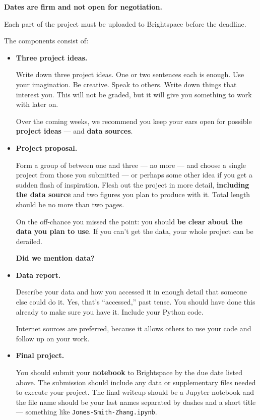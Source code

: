 \documentclass[11pt]{article}
\begin{document}
{\bf Dates are firm and not open for negotiation.}

Each part of the project must be uploaded to Brightspace before the deadline.


The components consist of:
\begin{itemize}

  \item {\bf Three project ideas.}

        Write down three project ideas. One or two sentences each is enough.
        Use your imagination.  Be creative.  Speak to others. Write down
        things that interest you. This will not be graded, but it will give
        you something to work with later on.

        Over the coming weeks, we recommend you keep your ears open for
        possible {\bf project ideas} --- and {\bf data sources\/}.

        \item{\bf Project proposal.}

        Form a group of between one and three --- no more --- and choose a
        single project from those you submitted --- or perhaps some other
        idea if you get a sudden flash of inspiration. Flesh out the project
        in more detail, {\bf including the data source\/} and two figures
        you plan to produce with it. Total length should be no more than two
        pages.

        On the off-chance you missed the point:  you should {\bf be clear about the
            data you plan to use\/}. If you can't get the data, your whole project can
        be derailed.

          {\bf Did we mention data?}

  \item {\bf Data report.}

        Describe your data and how you accessed it in enough detail that someone else
        could do it. Yes, that's ``accessed,'' past tense.  You should have done this
        already to make sure you have it. Include your Python code.

        Internet sources are preferred, because it allows others to use your code and
        follow up on your work.

  \item {\bf Final project.}

        You should submit your {\bf notebook\/} to Brightspace by the due date
        listed above. The submission should include any data or supplementary files
        needed to execute your project. The final writeup should be a Jupyter
        notebook and the file name should be your last names separated by dashes and
        a short title --- something like {\tt Jones-Smith-Zhang.ipynb}.


\end{itemize}
\end{document}
